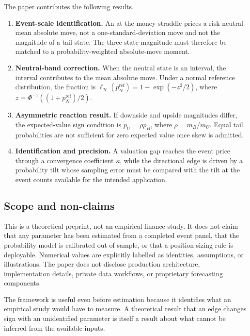 The paper contributes the following results.

\begin{enumerate}
\item \textbf{Event-scale identification.} An at-the-money straddle prices a
      risk-neutral mean absolute move, not a one-standard-deviation move and
      not the magnitude of a tail state. The three-state magnitude must
      therefore be matched to a probability-weighted absolute-move moment.
\item \textbf{Neutral-band correction.} When the neutral state is an interval,
      the interval contributes to the mean absolute move. Under a normal
      reference distribution, the fraction is
      $\ell_{\mathcal N}(p_N^{\mathrm{ref}})=1-\exp(-z^2/2)$, where
      $z=\Phi^{-1}((1+p_N^{\mathrm{ref}})/2)$.
\item \textbf{Asymmetric reaction result.} If downside and upside magnitudes
      differ, the expected-value sign condition is
      $p_U=\rho p_B$, where $\rho=m_B/m_U$. Equal tail probabilities are not
      sufficient for zero expected value once skew is admitted.
\item \textbf{Identification and precision.} A valuation gap reaches the event
      price through a convergence coefficient $\kappa$, while the directional
      edge is driven by a probability tilt whose sampling error must be compared
      with the tilt at the event counts available for the intended application.
\end{enumerate}

\subsection{Scope and non-claims}

This is a theoretical preprint, not an empirical finance study. It does not
claim that any parameter has been estimated from a completed event panel, that
the probability model is calibrated out of sample, or that a position-sizing
rule is deployable. Numerical values are explicitly labelled as identities,
assumptions, or illustrations. The paper does not disclose production
architecture, implementation details, private data workflows, or proprietary
forecasting components.

The framework is useful even before estimation because it identifies what an
empirical study would have to measure. A theoretical result that an edge changes
sign with an unidentified parameter is itself a result about what cannot be
inferred from the available inputs.

